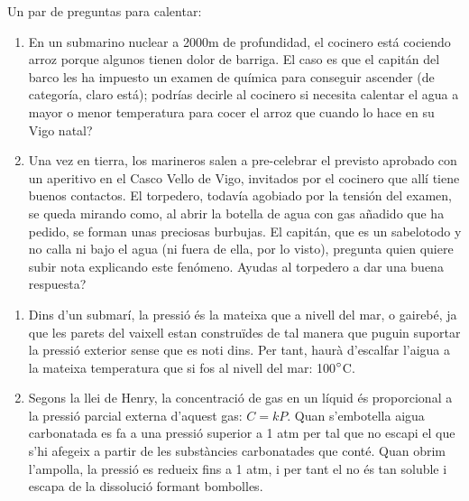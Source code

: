 \documentclass[11pt]{article}
\begin{document}
{Un par de preguntas para calentar: 
\begin{enumerate}[label=\emph{\alph*})]
\item En un submarino nuclear a 2000m de profundidad, el cocinero está cociendo arroz porque algunos tienen dolor de barriga. El caso es que el capitán del barco les ha impuesto un examen de química para conseguir ascender (de categoría, claro está); podrías decirle al cocinero si necesita calentar el agua a mayor o menor temperatura para cocer el arroz que cuando lo hace en su Vigo natal? 
\item Una vez en tierra, los marineros salen a pre-celebrar el previsto aprobado con un aperitivo en el Casco Vello de Vigo, invitados por el cocinero que allí tiene buenos contactos. El torpedero, todavía agobiado por la tensión del examen, se queda mirando como, al abrir la botella de agua con gas añadido que ha pedido, se forman unas preciosas burbujas. El capitán, que es un sabelotodo y no calla ni bajo el agua (ni fuera de ella, por lo visto), pregunta quien quiere subir nota explicando este fenómeno. Ayudas al torpedero a dar una buena respuesta?
\end{enumerate}
}
{
\vfill
\newpage
}
{
\begin{enumerate}[label=\emph{\alph*})]
\item Dins d'un submarí, la pressió és la mateixa que a nivell del mar, o gairebé, ja que les parets del vaixell estan construïdes de tal manera que puguin suportar la pressió exterior sense que es noti dins. Per tant, haurà d'escalfar l'aigua a la mateixa temperatura que si fos al nivell del mar: 100$\degree$C.
\item Segons la llei de Henry, la concentració de gas en un líquid és proporcional a la pressió parcial externa d'aquest gas: $C=kP$. Quan s'embotella  aigua carbonatada es fa a una pressió superior a 1 atm per tal que no escapi el  que s'hi afegeix a partir de les substàncies carbonatades que conté. Quan obrim l'ampolla, la pressió es redueix fins a 1 atm, i per tant el  no és tan soluble i escapa de la dissolució formant bombolles. 
\end{enumerate}
}
\end{document}
